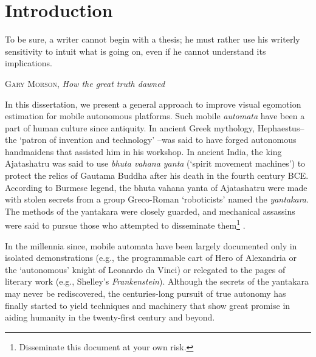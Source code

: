 \chapter{Introduction}
\label{ch:intro}
\epigraph{To be sure, a writer cannot begin with a thesis; he must rather use his writerly sensitivity to intuit what is going on, even if he cannot understand its implications.}{\textsc{Gary Morson}, \textit{How the great truth dawned}}
 





In this dissertation, we present a general approach to improve visual egomotion estimation for mobile autonomous platforms. Such mobile \textit{automata} have been a part of human culture since antiquity. In ancient Greek mythology, Hephaestus--the `patron of invention and technology' \citep{MayorGodsRobots2019}--was said to have forged autonomous handmaidens that assisted him in his workshop. In ancient India, the king Ajatashatru was said to use \textit{bhuta vahana yanta} (`spirit movement machines') to protect the relics of Gautama Buddha after his death in the fourth century BCE. According to Burmese legend, the bhuta vahana yanta of Ajatashatru were made with stolen secrets from a group Greco-Roman `roboticists' named the \textit{yantakara}. The methods of the yantakara were closely guarded, and mechanical assassins were said to pursue those who attempted to disseminate them\footnote{Disseminate this document at your own risk.} \citep{MayorGodsRobots2019}.

In the millennia since, mobile automata have been largely documented only in isolated demonstrations (e.g., the programmable cart of Hero of Alexandria or the `autonomous' knight of Leonardo da Vinci) or relegated to the pages of literary work (e.g., Shelley's \textit{Frankenstein}). Although the secrets of the yantakara may never be rediscovered, the centuries-long pursuit of true autonomy has finally started to yield techniques and machinery that show great promise in aiding humanity in the twenty-first century and beyond.

